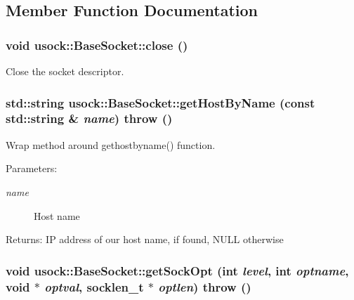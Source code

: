 \subsection{Member Function Documentation}
\hypertarget{classusock_1_1BaseSocket_06383c7ad352244fb0e5e6276e5e86c2}{
\subsubsection[{close}]{\setlength{\rightskip}{0pt plus 5cm}void usock::BaseSocket::close ()}}
\label{classusock_1_1BaseSocket_06383c7ad352244fb0e5e6276e5e86c2}


Close the socket descriptor. 

\hypertarget{classusock_1_1BaseSocket_7ffc3a11be4a9d7ba72a1f66f3dbad68}{
\subsubsection[{getHostByName}]{\setlength{\rightskip}{0pt plus 5cm}std::string usock::BaseSocket::getHostByName (const std::string \& {\em name})  throw ()}}
\label{classusock_1_1BaseSocket_7ffc3a11be4a9d7ba72a1f66f3dbad68}


Wrap method around gethostbyname() function. 

\begin{Desc}
\item[Parameters:]
\begin{description}
\item[{\em name}]Host name \end{description}
\end{Desc}
\begin{Desc}
\item[Returns:]IP address of our host name, if found, NULL otherwise \end{Desc}
\hypertarget{classusock_1_1BaseSocket_87925e8c3b89a50f8c8c2a68e0d2ab70}{
\subsubsection[{getSockOpt}]{\setlength{\rightskip}{0pt plus 5cm}void usock::BaseSocket::getSockOpt (int {\em level}, \/  int {\em optname}, \/  void $\ast$ {\em optval}, \/  socklen\_\-t $\ast$ {\em optlen})  throw ()}}
\label{classusock_1_1BaseSocket_87925e8c3b89a50f8c8c2a68e0d2ab70}


